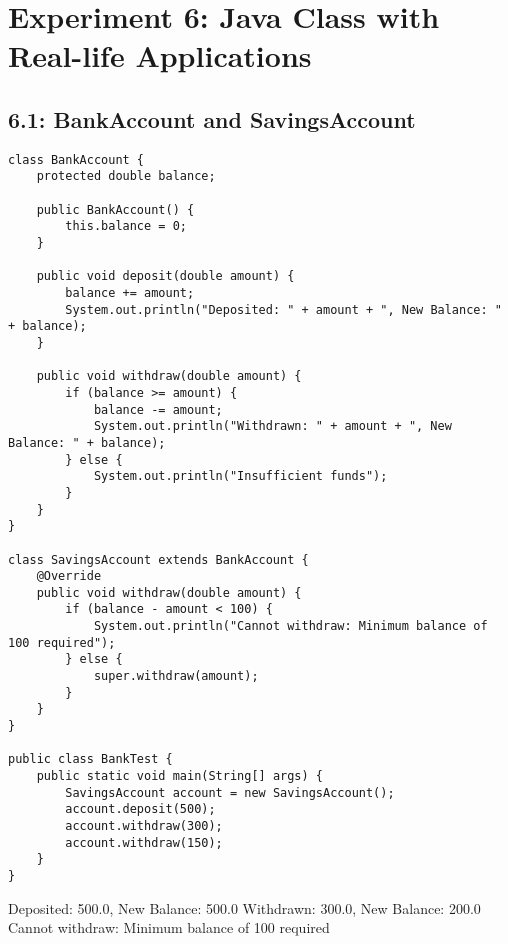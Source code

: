 \documentclass[a4paper,12pt]{article}
\begin{document}
\section{Experiment 6: Java Class with Real-life Applications}

\clearpage
\subsection{6.1: BankAccount and SavingsAccount}
\begin{samepage}
\begin{lstlisting}[caption={BankTest.java}]
class BankAccount {
    protected double balance;
    
    public BankAccount() {
        this.balance = 0;
    }
    
    public void deposit(double amount) {
        balance += amount;
        System.out.println("Deposited: " + amount + ", New Balance: " + balance);
    }
    
    public void withdraw(double amount) {
        if (balance >= amount) {
            balance -= amount;
            System.out.println("Withdrawn: " + amount + ", New Balance: " + balance);
        } else {
            System.out.println("Insufficient funds");
        }
    }
}

class SavingsAccount extends BankAccount {
    @Override
    public void withdraw(double amount) {
        if (balance - amount < 100) {
            System.out.println("Cannot withdraw: Minimum balance of 100 required");
        } else {
            super.withdraw(amount);
        }
    }
}

public class BankTest {
    public static void main(String[] args) {
        SavingsAccount account = new SavingsAccount();
        account.deposit(500);
        account.withdraw(300);
        account.withdraw(150);
    }
}
\end{lstlisting}

\begin{outputlisting}
Deposited: 500.0, New Balance: 500.0
Withdrawn: 300.0, New Balance: 200.0
Cannot withdraw: Minimum balance of 100 required
\end{outputlisting}
\end{samepage}

\clearpage
\end{document}
